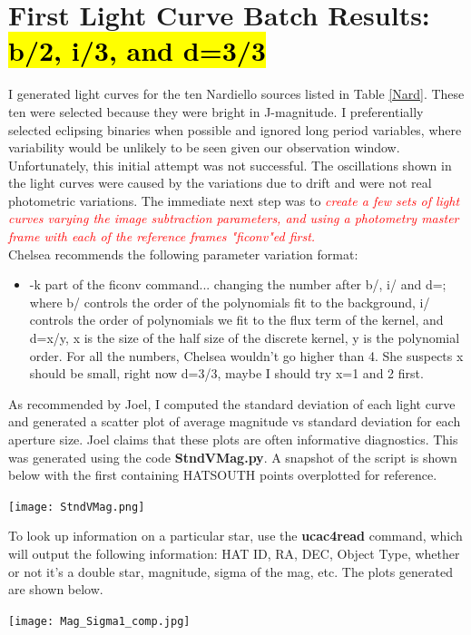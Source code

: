 \section*{First Light Curve Batch Results: \hl{\textbf{b}/2, \textbf{i}/3, and \textbf{d}=3/3}}
I generated light curves for the ten Nardiello sources listed in Table \ref{Nard}. These ten were selected because they were bright in J-magnitude. I preferentially selected eclipsing binaries when possible and ignored long period variables, where variability would be unlikely to be seen given our observation window. Unfortunately, this initial attempt was not successful. The oscillations shown in the light curves were caused by the variations due to drift and were not real photometric variations. 
The immediate next step was to \textcolor{red}{\textit{create a few sets of light curves varying the image subtraction parameters, and using a photometry master frame with each of the reference frames "ficonv"ed first.}}\\
Chelsea recommends the following parameter variation format:
\begin{itemize}
\item -k part of the ficonv command... changing the number after b/, i/ and d=;\\
where b/ controls the order of the polynomials fit to the background, i/ controls the order of polynomials we fit to the flux term of the kernel, and d=x/y, x is the size of the half size of the discrete kernel, y is the polynomial order. For all the numbers, Chelsea wouldn't go higher than 4.
She suspects x should be small, right now d=3/3, maybe I should try x=1 and 2 first. 
\end{itemize}
As recommended by Joel, I computed the standard deviation of each light curve and generated a scatter plot of average magnitude vs standard deviation for each aperture size. Joel claims that these plots are often informative diagnostics. 
This was generated using the code \textbf{StndVMag.py}. A snapshot of the script is shown below with the first containing HATSOUTH points overplotted for reference. 
\begin{center}
\texttt{[image: StndVMag.png]}\\ 
\end{center}
To look up information on a particular star, use the \textbf{ucac4read} command, which will output the following information: HAT ID, RA, DEC, Object Type, whether or not it's a double star, magnitude, sigma of the mag, etc. 
The plots generated are shown below.
\begin{center}
\texttt{[image: Mag\_Sigma1\_comp.jpg]}\\ 
\end{center}
